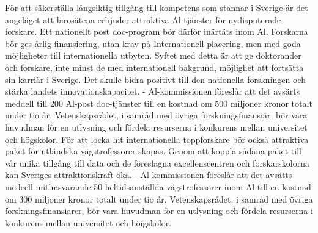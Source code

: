 {{{{{{{{För att säkerställa långsiktig tillgång till kompetens som stannar i Sverige är det angeläget att lärosätena erbjuder attraktiva Al-tjänster för nydisputerade forskare. Ett nationellt post doc-program bör därför inärtäts inom Al. Forskarna bör ges årlig finansiering, utan krav på Internationell placering, men med goda möjligheter till internationella utbyten. Syftet med detta är att ge doktorander och forskare, inte minst de med internationell bakgrund, möjlighet att fortsätta sin karriär i Sverige. Det skulle bidra positivt till den nationella forskningen och stärka landets innovationskapacitet.
- Al-kommissionen föreslår att det avsärts meddell till 200 Al-post doc-tjänster till en kostnad om 500 miljoner kronor totalt under tio år. Vetenskapsrådet, i samråd med övriga forskningsfinansiär, bör vara huvudman för en
utlysning och fördela resurserna i konkurens mellan universitet och högskolor.
För att locka hit internationella toppforskare bör också attraktiva paket för utländska vägstrofessorer skapas. Genom att koppla sådana paket till vår unika tillgång till data och de föreslagna excellenscentren och forskarskolorna kan Sveriges attraktionskraft öka.
- Al-kommissionen föreslår att det avsätts medeell mitlmsvarande 50 heltidsanställda vägstrofessorer inom Al till en kostnad om 300 miljoner kronor totalt under tio år. Vetenskapsrådet, i samråd med övriga forskningsfinansiärer, bör vara huvudman för en utlysning och fördela resurserna i konkurens mellan universitet och höigskolor.
}}}}}}}}
